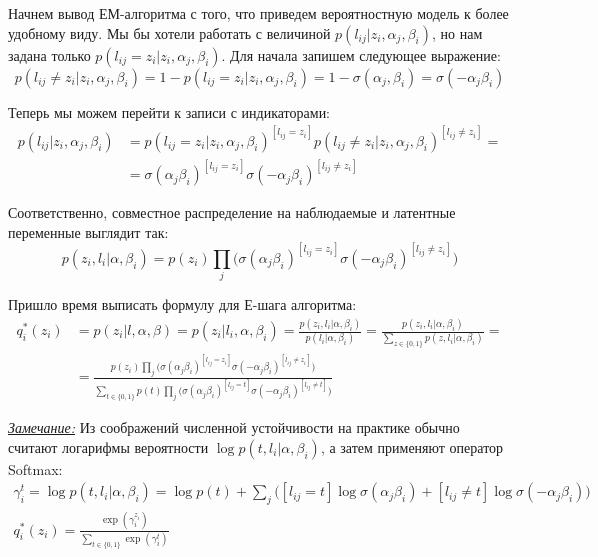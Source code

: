 \documentclass[12pt,a4paper]{article}
\begin{document}
\begin{esSolution}
    \par Начнем вывод ЕМ-алгоритма с того, что приведем вероятностную модель к более удобному виду. Мы бы хотели работать с величиной $p(l_{ij}|z_i, \alpha_j, \beta_i)$, но нам задана только $p(l_{ij} = z_{i}| z_{i}, \alpha_j, \beta_i)$. Для начала запишем следующее выражение:
    \begin{equation*}
        p(l_{ij} \ne z_i | z_{i}, \alpha_j, \beta_i) = 1 - p(l_{ij} = z_{i}| z_{i}, \alpha_j, \beta_i) = 1 - \sigma(\alpha_j, \beta_i) = \sigma(-\alpha_j \beta_i)
    \end{equation*}
    
    Теперь мы можем перейти к записи с индикаторами:
    \begin{align*}
        p(l_{ij}|z_i, \alpha_j, \beta_i) &= p(l_{ij} = z_i | z_{i}, \alpha_j, \beta_i)^{[l_{ij} = z_i]} p(l_{ij} \ne z_i | z_{i}, \alpha_j, \beta_i)^{[l_{ij} \ne z_i]} = \\
        &= \sigma(\alpha_j \beta_i)^{[l_{ij} = z_i]} \sigma(-\alpha_j \beta_i)^{[l_{ij} \ne z_i]}
    \end{align*}
    
    Соответственно, совместное распределение на наблюдаемые и латентные переменные выглядит так:
    \begin{equation*}
        p(z_i, l_i | \alpha, \beta_i) = p(z_i) \prod_j \bigg( \sigma(\alpha_j \beta_i)^{[l_{ij} = z_i]} \sigma(-\alpha_j \beta_i)^{[l_{ij} \ne z_i]} \bigg)
    \end{equation*}
    
    \par Пришло время выписать формулу для Е-шага алгоритма:
    \begin{align*}
        q^*_i(z_i) &= p(z_i | l, \alpha, \beta) = p(z_i | l_i, \alpha, \beta_i) = \frac{p(z_i, l_i | \alpha, \beta_i)}{p(l_i | \alpha, \beta_i)} = \frac{p(z_i, l_i | \alpha, \beta_i)}{\sum_{z\in \{0, 1\}} p(z, l_i | \alpha, \beta_i)} = \\
        &= \frac{p(z_i) \prod_j \Big( \sigma(\alpha_j \beta_i)^{[l_{ij} = z_i]} \sigma(-\alpha_j \beta_i)^{[l_{ij} \ne z_i]} \Big)}{\sum_{t \in \{0, 1\}} p(t) \prod_j \Big( \sigma(\alpha_j \beta_i)^{[l_{ij} = t]} \sigma(-\alpha_j \beta_i)^{[l_{ij} \ne t]} \Big)}
    \end{align*}
\end{esSolution}

\underline{\textit{Замечание:}} Из соображений численной устойчивости на практике обычно считают логарифмы вероятности $\log p(t, l_i | \alpha, \beta_i)$, а затем применяют оператор Softmax:
    \begin{gather*}
        \gamma^{t}_{i} = \log p(t, l_i | \alpha, \beta_i) = \log p(t) + \sum_{j} \bigg([l_{ij} = t]\log \sigma (\alpha_j \beta_i) + [l_{ij} \ne t]\log \sigma(-\alpha_j \beta_i) \bigg) \\
        q^*_i(z_i) = \frac{\exp(\gamma_i^{z_i})}{\sum_{t \in \{0, 1\}} \exp(\gamma_i^t)}
    \end{gather*}
\end{document}
